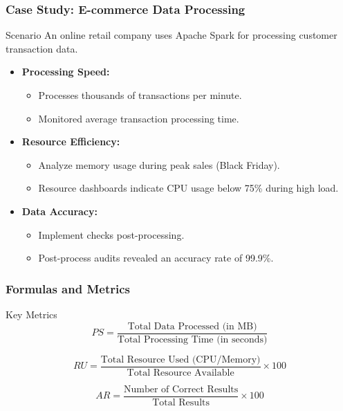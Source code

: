 \documentclass[aspectratio=169]{beamer}
\begin{document}
\begin{frame}[fragile]
    \frametitle{Case Study: E-commerce Data Processing}
    \begin{block}{Scenario}
        An online retail company uses Apache Spark for processing customer transaction data.
    \end{block}
    
    \begin{itemize}
        \item \textbf{Processing Speed:}
            \begin{itemize}
                \item Processes thousands of transactions per minute.
                \item Monitored average transaction processing time.
            \end{itemize}
        
        \item \textbf{Resource Efficiency:}
            \begin{itemize}
                \item Analyze memory usage during peak sales (Black Friday).
                \item Resource dashboards indicate CPU usage below 75\% during high load.
            \end{itemize}
        
        \item \textbf{Data Accuracy:}
            \begin{itemize}
                \item Implement checks post-processing.
                \item Post-process audits revealed an accuracy rate of 99.9\%.
            \end{itemize}
    \end{itemize}
\end{frame}

\begin{frame}[fragile]
    \frametitle{Formulas and Metrics}
    \begin{block}{Key Metrics}
        \begin{equation}
            PS = \frac{\text{Total Data Processed (in MB)}}{\text{Total Processing Time (in seconds)}}
        \end{equation}
        
        \begin{equation}
            RU = \frac{\text{Total Resource Used (CPU/Memory)}}{\text{Total Resource Available}} \times 100
        \end{equation}
        
        \begin{equation}
            AR = \frac{\text{Number of Correct Results}}{\text{Total Results}} \times 100
        \end{equation}
    \end{block}
\end{frame}
\end{document}
